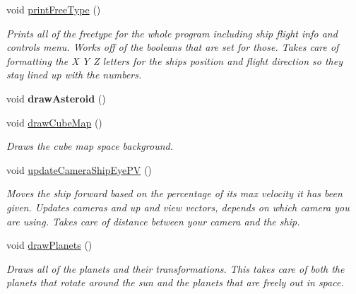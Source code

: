 \begin{DoxyCompactItemize}
\mbox{\label{class_graphics_engine_affeefdb9e087e20e3d6c0519eef11956}} 
void \hyperlink{class_graphics_engine_affeefdb9e087e20e3d6c0519eef11956}{print\+Free\+Type} ()
\begin{DoxyCompactList}\small\item\em Prints all of the freetype for the whole program including ship flight info and controls menu. Works off of the booleans that are set for those. Takes care of formatting the X Y Z letters for the ship\textquotesingle{}s position and flight direction so they stay lined up with the numbers. \end{DoxyCompactList}\item 
\mbox{\label{class_graphics_engine_a2ad06c87da71362307111510a1a99934}} 
void {\bfseries draw\+Asteroid} ()
\item 
\mbox{\label{class_graphics_engine_a32b876302cf24cb9811927445fc2b211}} 
void \hyperlink{class_graphics_engine_a32b876302cf24cb9811927445fc2b211}{draw\+Cube\+Map} ()
\begin{DoxyCompactList}\small\item\em Draws the cube map space background. \end{DoxyCompactList}\item 
\mbox{\label{class_graphics_engine_a4ec4010af498a65eee81ea787afd3d88}} 
void \hyperlink{class_graphics_engine_a4ec4010af498a65eee81ea787afd3d88}{update\+Camera\+Ship\+Eye\+PV} ()
\begin{DoxyCompactList}\small\item\em Moves the ship forward based on the percentage of it\textquotesingle{}s max velocity it has been given. Updates cameras and up and view vectors, depends on which camera you are using. Takes care of distance between your camera and the ship. \end{DoxyCompactList}\item 
\mbox{\label{class_graphics_engine_aa246f8e379edd8bdc76b4b059ba88037}} 
void \hyperlink{class_graphics_engine_aa246f8e379edd8bdc76b4b059ba88037}{draw\+Planets} ()
\begin{DoxyCompactList}\small\item\em Draws all of the planets and their transformations. This takes care of both the planets that rotate around the sun and the planets that are freely out in space. \end{DoxyCompactList}\item 

\end{DoxyCompactItemize}
